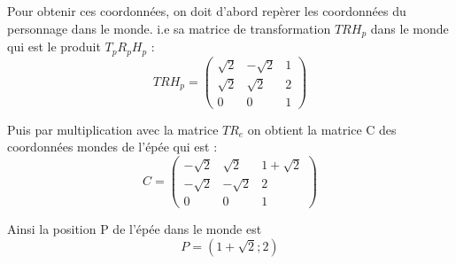 \documentclass[a4paper,12pt]{article}
\begin{document}
\begin{enumerate}
Pour obtenir ces coordonnées, on doit d'abord repèrer les coordonnées du personnage dans le monde. i.e sa matrice de transformation $TRH_p$ dans le monde qui est le produit $T_p R_p H_p$ :
 \begin{equation}\boxed{
TRH_p = 
\begin{pmatrix}
\sqrt{2} & -\sqrt{2} & 1 \\
\sqrt{2} & \sqrt{2} & 2 \\
0 & 0 & 1
\end{pmatrix}} \end{equation}

Puis par multiplication avec la matrice $TR_e$ on obtient la matrice C des coordonnées mondes de l'épée qui est :
 \begin{equation}\boxed{
C = 
\begin{pmatrix}
-\sqrt{2} & \sqrt{2} & 1+\sqrt{2} \\
-\sqrt{2} & -\sqrt{2} & 2 \\
0 & 0 & 1
\end{pmatrix}} \end{equation}

Ainsi la position P de l'épée dans le monde est 
\[\boxed{
P =  (1+\sqrt{2};2)} 
\]

\end{enumerate}

\newpage
\end{document}

